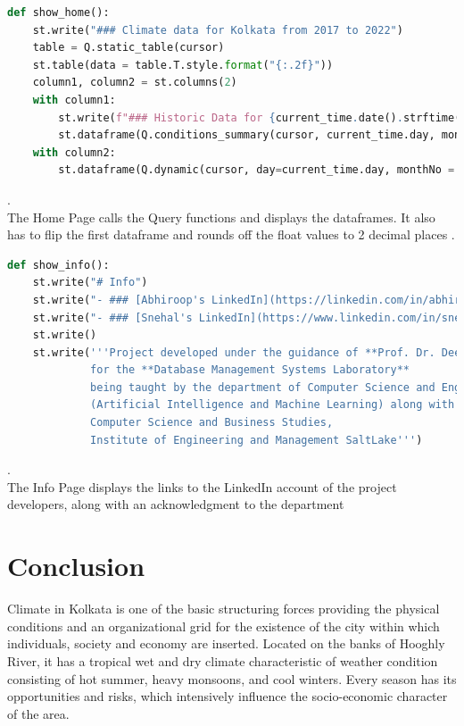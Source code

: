\documentclass[12pt, a4paper]{article}
\begin{document}
\begin{lstlisting}[language=Python, breaklines=true]
def show_home():
    st.write("### Climate data for Kolkata from 2017 to 2022")
    table = Q.static_table(cursor)
    st.table(data = table.T.style.format("{:.2f}"))
    column1, column2 = st.columns(2)
    with column1:
        st.write(f"### Historic Data for {current_time.date().strftime('%d %B')}")
        st.dataframe(Q.conditions_summary(cursor, current_time.day, monthNo = current_time.month).T)
    with column2:
        st.dataframe(Q.dynamic(cursor, day=current_time.day, monthNo = current_time.month))
\end{lstlisting}
.\\
The Home Page calls the Query functions and displays the dataframes. It also has to flip the first dataframe and rounds off the float values to 2 decimal places
\newpage
.\\

\begin{lstlisting}[language=Python, breaklines=true]
def show_info():
    st.write("# Info")
    st.write("- ### [Abhiroop's LinkedIn](https://linkedin.com/in/abhiroop2004)")
    st.write("- ### [Snehal's LinkedIn](https://www.linkedin.com/in/snehal-ghosh-164a63263)")
    st.write()
    st.write('''Project developed under the guidance of **Prof. Dr. Deepshubhra Guha Roy**
             for the **Database Management Systems Laboratory**
             being taught by the department of Computer Science and Engineering
             (Artificial Intelligence and Machine Learning) along with 
             Computer Science and Business Studies,
             Institute of Engineering and Management SaltLake''')
\end{lstlisting}
.\\

The Info Page displays the links to the LinkedIn account of the project developers, along with an acknowledgment to the department 
\newpage
\section{Conclusion}
Climate in Kolkata is one of the basic structuring forces providing the physical conditions and an organizational grid for the existence of the city within which individuals, society and economy are inserted. Located on the banks of Hooghly River, it has a tropical wet and dry climate characteristic of weather condition consisting of hot summer, heavy monsoons, and cool winters. Every season has its opportunities and risks, which intensively influence the socio-economic character of the area.
\end{document}
